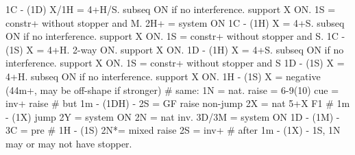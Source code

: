 1C - (1D) 
    X/1H = 4+H/S. subseq ON if no interference. support X ON.
    1S = constr+ without stopper and M.
    2H+ = system ON
1C - (1H)
    X = 4+S. subseq ON if no interference. support X ON.
    1S = constr+ without stopper and S.
1C - (1S)
    X = 4+H. 2-way ON. support X ON.
1D - (1H)
    X = 4+S. subseq ON if no interference. support X ON.
    1S = constr+ without stopper and S
1D - (1S)
    X = 4+H. subseq ON if no interference. support X ON.
1H - (1S)
    X = negative (44m+, may be off-shape if stronger)
# same:
    1N = nat.
    raise = 6-9(10)
    cue = inv+ raise  # but 1m - (1DH) - 2S = GF raise
    non-jump 2X = nat 5+X F1
# 1m - (1X)
    jump 2Y = system ON
    2N = nat inv.
    3D/3M = system ON
    1D - (1M) - 3C = pre
# 1H - (1S)
    2N*= mixed raise
    2S = inv+
# after 1m - (1X) - 1S, 1N may or may not have stopper.